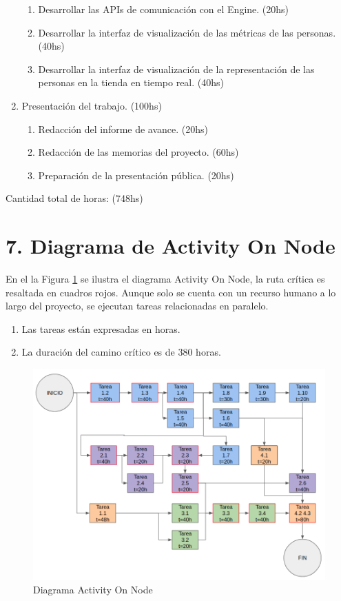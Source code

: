 \documentclass[11pt]{charter}
\begin{document}
\begin{enumerate}
\begin{enumerate}
	\item Desarrollar las APIs de comunicación con el Engine. (20hs)
	\item Desarrollar la interfaz de visualización de las métricas de las personas. (40hs)
	\item Desarrollar la interfaz de visualización de la representación de las personas en la tienda en tiempo real. (40hs)
	\end{enumerate}
\item Presentación del trabajo. (100hs)
	\begin{enumerate}
	\item Redacción del informe de avance. (20hs)
	\item Redacción de las memorias del proyecto. (60hs)
	\item Preparación de la presentación pública. (20hs)
	\end{enumerate}
\end{enumerate}

Cantidad total de horas: (748hs)


\section{7. Diagrama de Activity On Node}
\label{sec:AoN}

En el la Figura \ref{fig:diagAoN} se ilustra el diagrama Activity On Node, la ruta crítica es resaltada en cuadros rojos. Aunque solo se cuenta con un recurso humano a lo largo del proyecto, se ejecutan tareas relacionadas en paralelo.
\begin{enumerate}
\item Las tareas están expresadas en horas.
\item La duración del camino crítico es de 380 horas.
\end{enumerate}

\begin{figure}[htpb]
\centering 
\includegraphics[width=1.\textwidth]{./Figuras/diagAoN.png}
\caption{Diagrama Activity On Node}
\label{fig:diagAoN}
\end{figure}
\end{document}
